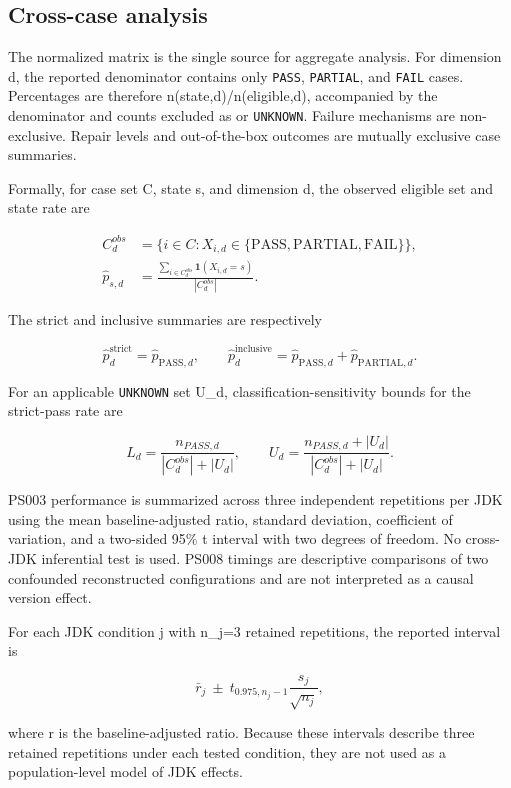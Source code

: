 \documentclass[a4paper,fleqn]{cas-dc}
\begin{document}
\subsection{Cross-case analysis}

The normalized matrix is the single source for aggregate analysis. For dimension d, the reported denominator contains only \texttt{PASS}, \texttt{PARTIAL}, and \texttt{FAIL} cases. Percentages are therefore n(state,d)/n(eligible,d), accompanied by the denominator and counts excluded as \protect{} or \texttt{UNKNOWN}. Failure mechanisms are non-exclusive. Repair levels and out-of-the-box outcomes are mutually exclusive case summaries.

Formally, for case set C, state s, and dimension d, the observed eligible set and state rate are

\begin{align}
C_d^{obs} &= \{i\in C : X_{i,d}\in\{\mathrm{PASS},\mathrm{PARTIAL},\mathrm{FAIL}\}\},\\
\hat p_{s,d} &= \frac{\sum_{i\in C_d^{obs}}\mathbf{1}(X_{i,d}=s)}{|C_d^{obs}|}.
\end{align}

The strict and inclusive summaries are respectively

\[
\hat p_d^{\mathrm{strict}}=\hat p_{\mathrm{PASS},d},\qquad\hat p_d^{\mathrm{inclusive}}=\hat p_{\mathrm{PASS},d}+\hat p_{\mathrm{PARTIAL},d}.
\]

For an applicable \texttt{UNKNOWN} set U\_d, classification-sensitivity bounds for the strict-pass rate are

\[
L_d=\frac{n_{PASS,d}}{|C_d^{obs}|+|U_d|},\qquad U_d=\frac{n_{PASS,d}+|U_d|}{|C_d^{obs}|+|U_d|}.
\]

PS003 performance is summarized across three independent repetitions per JDK using the mean baseline-adjusted \protect{} ratio, standard deviation, coefficient of variation, and a two-sided 95\% t interval with two degrees of freedom. No cross-JDK inferential test is used. PS008 timings are descriptive comparisons of two confounded reconstructed configurations and are not interpreted as a causal version effect.

For each JDK condition j with n\_j=3 retained repetitions, the reported interval is

\[
\bar r_j\ \pm\ t_{0.975,n_j-1}\frac{s_j}{\sqrt{n_j}},
\]

where r is the baseline-adjusted \protect{} ratio. Because these intervals describe three retained repetitions under each tested condition, they are not used as a population-level model of JDK effects.
\end{document}
